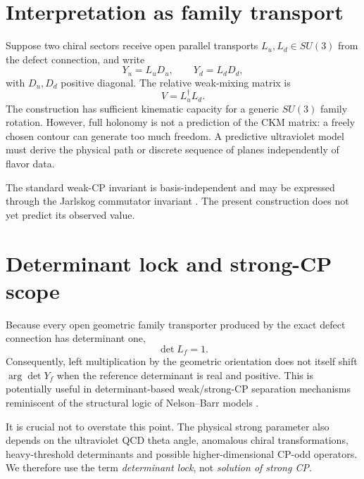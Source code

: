 \documentclass[11pt]{article}
\theoremstyle{remark}\newtheorem{remark}{Remark}
\begin{document}
\section{Interpretation as family transport}
Suppose two chiral sectors receive open parallel transports $L_u,L_d\in SU(3)$ from the defect connection, and write
\begin{equation}
Y_u=L_uD_u,\qquad Y_d=L_dD_d,
\end{equation}
with $D_u,D_d$ positive diagonal. The relative weak-mixing matrix is
\begin{equation}
V=L_u^\dagger L_d.
\end{equation}
The construction has sufficient kinematic capacity for a generic $SU(3)$ family rotation. However, full holonomy is not a prediction of the CKM matrix: a freely chosen contour can generate too much freedom. A predictive ultraviolet model must derive the physical path or discrete sequence of planes independently of flavor data.

The standard weak-CP invariant is basis-independent and may be expressed through the Jarlskog commutator invariant \cite{Jarlskog1985}. The present construction does not yet predict its observed value.

\section{Determinant lock and strong-CP scope}
Because every open geometric family transporter produced by the exact defect connection has determinant one,
\begin{equation}
\det L_f=1.
\end{equation}
Consequently, left multiplication by the geometric orientation does not itself shift $\arg\det Y_f$ when the reference determinant is real and positive. This is potentially useful in determinant-based weak/strong-CP separation mechanisms reminiscent of the structural logic of Nelson--Barr models \cite{Nelson1984,Barr1984}.

It is crucial not to overstate this point. The physical strong parameter also depends on the ultraviolet QCD theta angle, anomalous chiral transformations, heavy-threshold determinants and possible higher-dimensional CP-odd operators. We therefore use the term \emph{determinant lock}, not \emph{solution of strong CP}.
\end{document}
